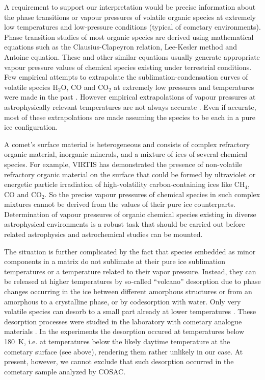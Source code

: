 \documentclass{aa}
\begin{document}
 A requirement to support our interpretation  would be precise information about the phase transitions or vapour pressures of volatile organic species at extremely low temperatures and low-pressure conditions (typical of cometary environments). Phase transition studies of most organic species are derived using mathematical equations  such as
the Clausius-Clapeyron relation, Lee-Kesler 
method and Antoine equation. These and other similar equations usually generate appropriate vapour 
pressure values of chemical species existing under terrestrial conditions. Few empirical attempts to extrapolate 
the sublimation-condensation curves of volatile species $\mathrm{H_2O}$, CO and $\mathrm{CO_2}$ 
at extremely low pressures and temperatures were made in the past 
\citep{yamamoto1983,prialnik2005,huebner2006,fray2009}. However empirical extrapolations of vapour 
pressures at astrophysically relevant temperatures are not always accurate \citep{fray2009}. Even 
if accurate, most of these extrapolations are made assuming the species to be each in a pure ice configuration. 

A comet's surface material is heterogeneous and consists of complex refractory organic material, 
inorganic minerals, and a mixture of ices of several chemical species. For example, VIRTIS has 
demonstrated the 
presence of non-volatile refractory organic material on the surface that could be formed by ultraviolet 
or energetic particle irradiation of high-volatility carbon-containing ices like 
$\mathrm{CH_4}$, CO and $\mathrm{CO_2}$. So the precise vapour pressures of chemical species in 
such complex mixtures cannot be derived from the values of their pure ice counterparts. 
Determination of vapour pressures of organic chemical species existing in diverse astrophysical 
environments is a robust task that should be carried out before related astrophysics and astrochemical studies can be mounted.

 The situation is further complicated by the fact that species embedded as minor components in a 
matrix do not sublimate at their pure ice sublimation temperatures or a temperature related to their 
vapor pressure. Instead, they can be released at higher temperatures by so-called ``volcano'' 
desorption due to phase changes occurring in the ice between different amorphous structures or
from an amorphous to a crystalline phase, or by codesorption with water. Only very volatile 
species can desorb to a small part already at lower temperatures 
\citep{collings2004}. These desorption processes were studied in the laboratory with 
cometary analogue materials \citep{martin-domenech2014}. In the experiments the desorption occured
at temperatures below 180~K, i.e. at temperatures below the likely 
daytime temperature at the cometary surface (see above), rendering them rather unlikely in our case. 
At present, however, we cannot exclude that such desorption occurred in the cometary 
sample analyzed by COSAC.
\end{document}
